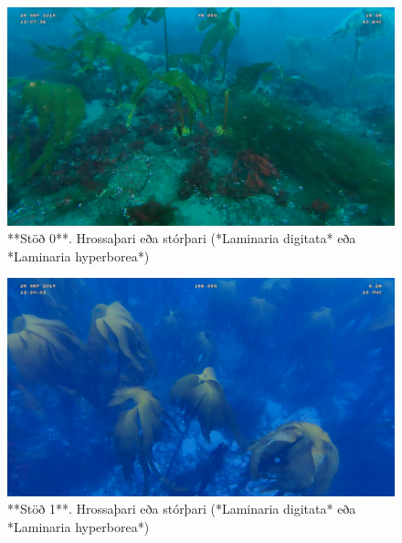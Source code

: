 \documentclass[icelandic,]{book}
\begin{document}
\begin{figure}

{\centering \includegraphics[width=1\linewidth]{skjol/skogar/sk6/stodvar/st1/sk6-st1C} 

}

\caption{**Stöð 0**. Hrossaþari eða stórþari (*Laminaria digitata* eða *Laminaria hyperborea*)}\label{fig:mynd-sk-sex-stod-eittC}
\end{figure}

\begin{figure}

{\centering \includegraphics[width=1\linewidth]{skjol/skogar/sk6/stodvar/st2/sk6-st2} 

}

\caption{**Stöð 1**. Hrossaþari eða stórþari (*Laminaria digitata* eða *Laminaria hyperborea*)}\label{fig:mynd-sk-sex-stod-tvo}
\end{figure}
\end{document}
